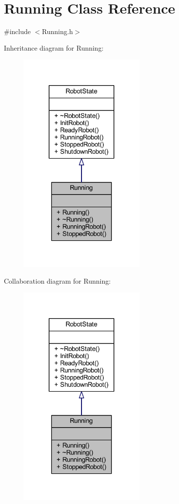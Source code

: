 \hypertarget{class_running}{}\section{Running Class Reference}
\label{class_running}


{\ttfamily \#include $<$Running.\+h$>$}



Inheritance diagram for Running\+:
\nopagebreak
\begin{figure}[H]
\begin{center}
\leavevmode
\includegraphics[width=180pt]{class_running__inherit__graph}
\end{center}
\end{figure}


Collaboration diagram for Running\+:
\nopagebreak
\begin{figure}[H]
\begin{center}
\leavevmode
\includegraphics[width=180pt]{class_running__coll__graph}
\end{center}
\end{figure}
